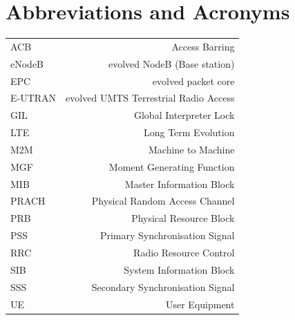 \documentclass[conference]{IEEEtran}
\begin{document}
\section*{Abbreviations and Acronyms}
    \begin{tabular}{l r}
        ACB & Access Barring\\
        eNodeB & evolved NodeB (Base station)\\
        EPC & evolved packet core\\
        E-UTRAN & evolved UMTS Terrestrial Radio Access\\
        GIL & Global Interpreter Lock\\
        LTE & Long Term Evolution\\
        M2M & Machine to Machine\\
        MGF & Moment Generating Function\\
        MIB & Master Information Block\\
        PRACH & Physical Random Access Channel\\
        PRB & Physical Resource Block\\
        PSS & Primary Synchronisation Signal\\
        RRC & Radio Resource Control\\
        SIB & System Information Block\\
        SSS & Secondary Synchronisation Signal\\
        UE & User Equipment\\
    \end{tabular}
%
%
\end{document}
